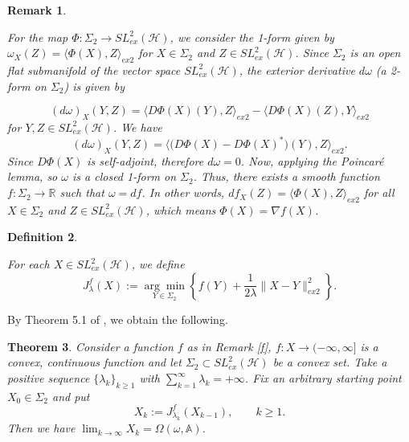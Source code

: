 \documentclass[12pt,reqno]{amsart}
\newtheorem{theorem}{Theorem}[section]
\newtheorem{Definition}[theorem]{Definition}
\newtheorem{Remark}[theorem]{Remark}
\newenvironment{remark}{\begin{Remark}\begin{em}}{\end{em}\end{Remark}}
\newenvironment{definition}{\begin{Definition}\begin{em}}{\end{em}\end{Definition}}
\begin{document}
\begin{remark}\label{f}
For the map $\Phi: \Sigma_2 \to  SL^{2}_{ex} (\mathcal{H})$, we consider the 1-form given by $\omega_X(Z) = \langle \Phi(X), Z \rangle_{ex 2}$ for $X \in \Sigma_2$ and $Z \in SL^{2}_{ex} (\mathcal{H})$.
Since $\Sigma_2$ is an open flat submanifold of the vector space $SL^{2}_{ex} (\mathcal{H})$, the exterior derivative $d\omega$ (a 2-form on $\Sigma_2$) is given by

\begin{displaymath}
(d\omega)_X(Y, Z) = \langle D\Phi(X)(Y), Z \rangle_{ex 2} - \langle D\Phi(X)(Z), Y \rangle_{ex 2}
\end{displaymath}
for $Y, Z \in SL^{2}_{ex} (\mathcal{H})$.
We have
\begin{displaymath}
(d\omega)_X(Y, Z) = \langle \big( D\Phi(X) - D\Phi(X)^* \big) (Y), Z \rangle_{ex 2}.
\end{displaymath}
Since $D\Phi(X)$ is self-adjoint, therefore $d\omega = 0$.
Now, applying the Poincaré lemma, so $\omega$ is a closed 1-form on $\Sigma_2$.
Thus, there exists a smooth function $f: \Sigma_2 \to \mathbb{R}$ such that $\omega = df$.
In other words, $df_X(Z) = \langle \Phi(X), Z \rangle_{ex 2}$ for all $X \in \Sigma_2$ and $Z \in  SL^{2}_{ex} (\mathcal{H})$, which means $\Phi(X) = \nabla f(X)$.
\end{remark}


\begin{definition}[Resolvent map]
For each $X \in SL^{2}_{ex} (\mathcal{H})$, we define
\begin{equation*}\label{eq:resolventabove}
J_{\lambda }^f(X):=\underset{Y \in \Sigma_2}{\arg \min} \left\{ f(Y)+\frac{1}{2\lambda}\|X-Y\|^2_{ex2} \right\}.
\end{equation*}
\end{definition}

By Theorem 5.1 of \cite{OP}, we obtain the following.

\begin{theorem}\label{T:3}
Consider a function $f$ as in Remark \ref{f},
$f:X\to (-\infty,\infty]$ is  a convex, continuous function
and let $ \Sigma_2 \subset SL^{2}_{ex} (\mathcal{H})$ be a convex set.
Take a positive sequence $\{\lambda_k\}_{k \ge 1}$ with $\sum_{k=1}^\infty\lambda_k=+\infty$.
Fix an arbitrary starting point $X_0\in \Sigma_2  $ and put
\[ X_{k}:=J_{\lambda_k}^f(X_{k-1}), \qquad k \ge 1. \]
Then we have $\lim_{k \to \infty} X_k= \Omega (\omega, \mathbb{A})$.
\end{theorem}
\end{document}
